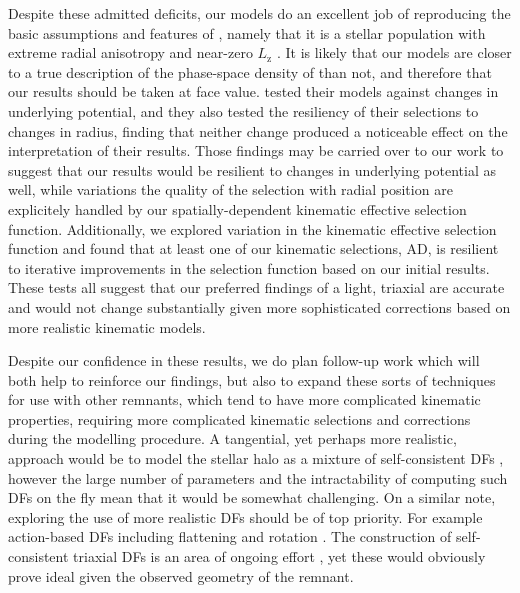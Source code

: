 Despite these admitted deficits, our models do an excellent job of reproducing the basic assumptions and features of \gse, namely that it is a stellar population with extreme radial anisotropy and near-zero $L_\mathrm{z}$ \parencite[see figure 4 in][for example]{lane22}. It is likely that our models are closer to a true description of the phase-space density of \gse than not, and therefore that our results should be taken at face value. \cite{lane22} tested their models against changes in underlying potential, and they also tested the resiliency of their selections to changes in radius, finding that neither change produced a noticeable effect on the interpretation of their results. Those findings may be carried over to our work to suggest that our results would be resilient to changes in underlying potential as well, while variations the quality of the selection with radial position are explicitely handled by our spatially-dependent kinematic effective selection function. Additionally, we explored variation in the kinematic effective selection function and found that at least one of our kinematic selections, AD, is resilient to iterative improvements in the selection function based on our initial results. These tests all suggest that our preferred findings of a light, triaxial \gse are accurate and would not change substantially given more sophisticated corrections based on more realistic kinematic models.

Despite our confidence in these results, we do plan follow-up work which will both help to reinforce our findings, but also to expand these sorts of techniques for use with other remnants, which tend to have more complicated kinematic properties, requiring more complicated kinematic selections and corrections during the modelling procedure. A tangential, yet perhaps more realistic, approach would be to model the stellar halo as a mixture of self-consistent DFs \parencite[see, e.g.][for similar studies using Gaussian mixtures]{lancaster19,iorio21}, however the large number of parameters and the intractability of computing such DFs on the fly mean that it would be somewhat challenging. On a similar note, exploring the use of more realistic DFs should be of top priority. For example action-based DFs \parencite{binney14d,posti15,williams15} including flattening and rotation \parencite{binney14d}. The construction of self-consistent triaxial DFs is an area of ongoing effort \parencite{sanders15a,binney18}, yet these would obviously prove ideal given the observed geometry of the \gse remnant.

